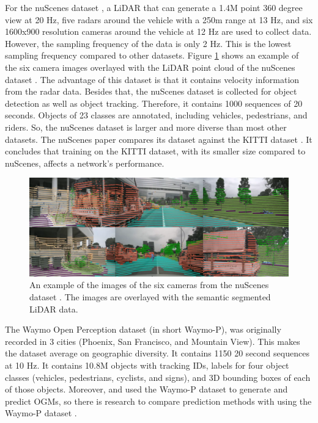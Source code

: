 For the nuScenes dataset \cite{caesar2020nuscenes}, a LiDAR that can generate a 1.4M point 360 degree view at 20 Hz, five radars around the vehicle with a 250m range at 13 Hz, and six 1600x900 resolution cameras around the vehicle at 12 Hz are used to collect data. However, the sampling frequency of the data is only 2 Hz. This is the lowest sampling frequency compared to other datasets. Figure \ref{fig:dat_nuscenes} shows an example of the six camera images overlayed with the LiDAR point cloud of the nuScenes dataset \cite{caesar2020nuscenes}. The advantage of this dataset is that it contains velocity information from the radar data. Besides that, the nuScenes dataset is collected for object detection as well as object tracking. Therefore, it contains 1000 sequences of 20 seconds. Objects of 23 classes are annotated, including vehicles, pedestrians, and riders. So, the nuScenes dataset \cite{caesar2020nuscenes} is larger and more diverse than most other datasets. The nuScenes paper \cite{caesar2020nuscenes} compares its dataset against the \gls{KITTI} dataset \cite{geiger2012we}. It concludes that training on the \gls{KITTI} dataset, with its smaller size compared to nuScenes, affects a network's performance. \\

\begin{figure}[h!]
	\centering
	\includegraphics[width=0.6\linewidth]{Figures/Datasets/NuScenes_Dataset}
	\caption{An example of the images of the six cameras from the nuScenes dataset \cite{caesar2020nuscenes}. The images are overlayed with the semantic segmented LiDAR data.}  
	\label{fig:dat_nuscenes}
\end{figure}

The Waymo Open Perception dataset \cite{sun2020scalability} (in short Waymo-P), was originally recorded in 3 cities (Phoenix, San Francisco, and Mountain View). This makes the dataset average on geographic diversity. It contains 1150 20 second sequences at 10 Hz. It contains 10.8M objects with tracking IDs, labels for four object classes (vehicles, pedestrians, cyclists, and signs), and 3D bounding boxes of each of those objects. Moreover, \cite{lange2020attention} and \cite{toyungyernsub2020double} used the Waymo-P dataset to generate and predict \glspl{OGM}, so there is research to compare prediction methods with using the Waymo-P dataset \cite{sun2020scalability}.


